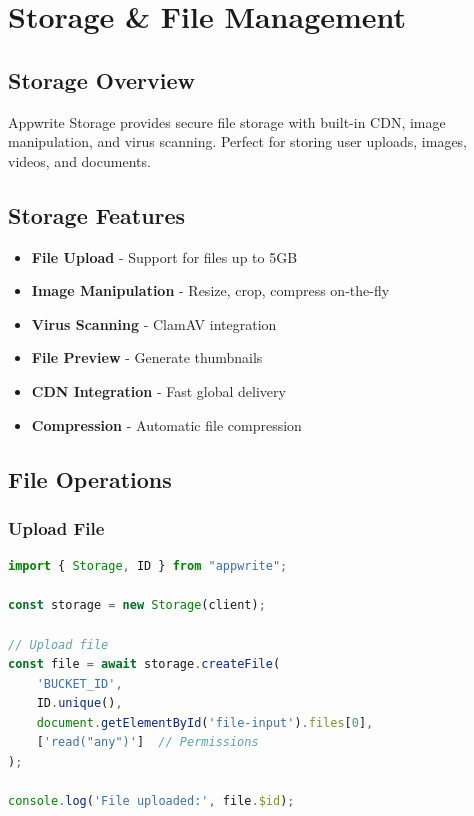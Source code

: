 \documentclass[11pt,a4paper,oneside]{book}
\begin{document}
\chapter{Storage \& File Management}

\section{Storage Overview}

\begin{keypoint}
Appwrite Storage provides secure file storage with built-in CDN, image manipulation, and virus scanning. Perfect for storing user uploads, images, videos, and documents.
\end{keypoint}

\section{Storage Features}

\begin{itemize}
    \item \textbf{File Upload} - Support for files up to 5GB
    \item \textbf{Image Manipulation} - Resize, crop, compress on-the-fly
    \item \textbf{Virus Scanning} - ClamAV integration
    \item \textbf{File Preview} - Generate thumbnails
    \item \textbf{CDN Integration} - Fast global delivery
    \item \textbf{Compression} - Automatic file compression
\end{itemize}

\section{File Operations}

\subsection{Upload File}

\begin{lstlisting}[language=JavaScript, caption=Uploading a File]
import { Storage, ID } from "appwrite";

const storage = new Storage(client);

// Upload file
const file = await storage.createFile(
    'BUCKET_ID',
    ID.unique(),
    document.getElementById('file-input').files[0],
    ['read("any")']  // Permissions
);

console.log('File uploaded:', file.$id);
\end{lstlisting}
\end{document}
